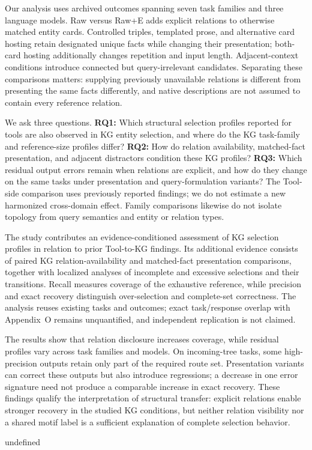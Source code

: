 Our analysis uses archived outcomes spanning seven task families and three language models. Raw versus Raw+E adds explicit relations to otherwise matched entity cards. Controlled triples, templated prose, and alternative card hosting retain designated unique facts while changing their presentation; both-card hosting additionally changes repetition and input length. Adjacent-context conditions introduce connected but query-irrelevant candidates. Separating these comparisons matters: supplying previously unavailable relations is different from presenting the same facts differently, and native descriptions are not assumed to contain every reference relation.

We ask three questions. \textbf{RQ1:} Which structural selection profiles reported for tools are also observed in KG entity selection, and where do the KG task-family and reference-size profiles differ? \textbf{RQ2:} How do relation availability, matched-fact presentation, and adjacent distractors condition these KG profiles? \textbf{RQ3:} Which residual output errors remain when relations are explicit, and how do they change on the same tasks under presentation and query-formulation variants? The Tool-side comparison uses previously reported findings; we do not estimate a new harmonized cross-domain effect. Family comparisons likewise do not isolate topology from query semantics and entity or relation types.

The study contributes an evidence-conditioned assessment of KG selection profiles in relation to prior Tool-to-KG findings. Its additional evidence consists of paired KG relation-availability and matched-fact presentation comparisons, together with localized analyses of incomplete and excessive selections and their transitions. Recall measures coverage of the exhaustive reference, while precision and exact recovery distinguish over-selection and complete-set correctness. The analysis reuses existing tasks and outcomes; exact task/response overlap with Appendix~O remains unquantified, and independent replication is not claimed.

The results show that relation disclosure increases coverage, while residual profiles vary across task families and models. On incoming-tree tasks, some high-precision outputs retain only part of the required route set. Presentation variants can correct these outputs but also introduce regressions; a decrease in one error signature need not produce a comparable increase in exact recovery. These findings qualify the interpretation of structural transfer: explicit relations enable stronger recovery in the studied KG conditions, but neither relation visibility nor a shared motif label is a sufficient explanation of complete selection behavior.

undefined